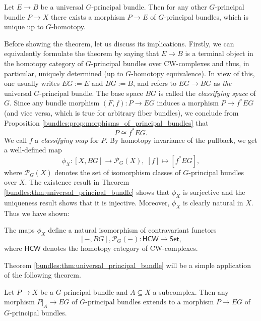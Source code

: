 \begin{theorem}
    \label{bundles:thm:universal_principal_bundle}
    Let $E \to B$ be a universal $G$-principal bundle. Then for any other $G$\nobreakdash-principal bundle $P \to X$ there exists a morphism $P \to E$ of $G$-principal bundles, which is unique up to $G$-homotopy.
\end{theorem}

Before showing the theorem, let us discuss its implications. Firstly, we can equivalently formulate the theorem by saying that $E \to B$ is a terminal object in the homotopy category of $G$-principal bundles over CW-complexes and thus, in particular, uniquely determined (up to $G$-homotopy equivalence). In view of this, one usually writes $EG := E$ and $BG := B$, and refers to $EG \to BG$ as \textit{the} universal $G$-principal bundle. The base space $BG$ is called the \textit{classifying space} of $G$. Since any bundle morphism $(F,f) \colon P \to EG$ induces a morphism $P \to f^\ast EG$ (and vice versa, which is true for arbitrary fiber bundles), we conclude from Proposition \ref{bundles:prop:morphisms_of_principal_bundles} that 
\[
P \cong f^\ast EG.
\]
We call $f$ a \textit{classifying map} for $P$. By homotopy invariance of the pullback, we get a well-defined map 
\[
\phi_X \colon [X,BG] \to \mathcal{P}_G(X), \; [f] \mapsto [f^\ast EG],
\]
where $\mathcal{P}_G(X)$ denotes the set of isomorphism classes of $G$-principal bundles over $X$. The existence result in Theorem \ref{bundles:thm:universal_principal_bundle} shows that $\phi_X$ is surjective and the uniqueness result shows that it is injective. Moreover, $\phi_X$ is clearly natural in $X$. Thus we have shown:

\begin{corollary}
\label{bundles:cor:universal_bundle_defines_natural_isomorphism}
    The maps $\phi_X$ define a natural isomorphism of contravariant functors 
    \[  
        [-,BG], \mathcal{P}_G(-) \colon \mathsf{HCW} \to \mathsf{Set},
    \]
    where $\mathsf{HCW}$ denotes the homotopy category of CW-complexes.
\end{corollary}

Theorem \ref{bundles:thm:universal_principal_bundle} will be a simple application of the following theorem.

\begin{theorem}
    \label{bundles:thm:extension_theorem}
    Let $P \to X$ be a $G$-principal bundle and $A \subseteq X$ a subcomplex. Then any morphism $P|_A \to EG$ of $G$-principal bundles extends to a morphism $P \to EG$ of $G$-principal bundles. 
\end{theorem}

